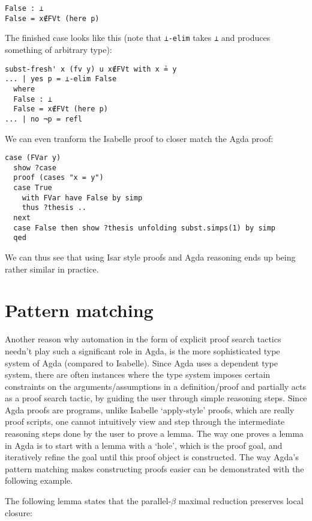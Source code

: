 \documentclass[a4paper, 12pt, twoside]{style/ociamthesis}
\theoremstyle{plain}
\theoremstyle{definition}
\theoremstyle{remark}
\begin{document}
\begin{verbatim}
False : ⊥
False = x∉FVt (here p)
\end{verbatim}

The finished case looks like this (note that \texttt{⊥-elim} takes
\texttt{⊥} and produces something of arbitrary type):

\begin{verbatim}
subst-fresh' x (fv y) u x∉FVt with x ≟ y
... | yes p = ⊥-elim False
  where
  False : ⊥
  False = x∉FVt (here p)
... | no ¬p = refl
\end{verbatim}

We can even tranform the Isabelle proof to closer match the Agda proof:

\begin{verbatim}
case (FVar y)
  show ?case
  proof (cases "x = y")
  case True
    with FVar have False by simp
    thus ?thesis ..
  next
  case False then show ?thesis unfolding subst.simps(1) by simp
  qed
\end{verbatim}

We can thus see that using Isar style proofs and Agda reasoning ends up
being rather similar in practice.

\section{Pattern matching}\label{pattern-matching}

Another reason why automation in the form of explicit proof search
tactics needn't play such a significant role in Agda, is the more
sophisticated type system of Agda (compared to Isabelle). Since Agda
uses a dependent type system, there are often instances where the type
system imposes certain constraints on the arguments/assumptions in a
definition/proof and partially acts as a proof search tactic, by guiding
the user through simple reasoning steps. Since Agda proofs are programs,
unlike Isabelle `apply-style' proofs, which are really proof scripts,
one cannot intuitively view and step through the intermediate reasoning
steps done by the user to prove a lemma. The way one proves a lemma in
Agda is to start with a lemma with a `hole', which is the proof goal,
and iteratively refine the goal until this proof object is constructed.
The way Agda's pattern matching makes constructing proofs easier can be
demonstrated with the following example.

The following lemma states that the parallel-\(\beta\) maximal reduction
preserves local closure:
\end{document}
